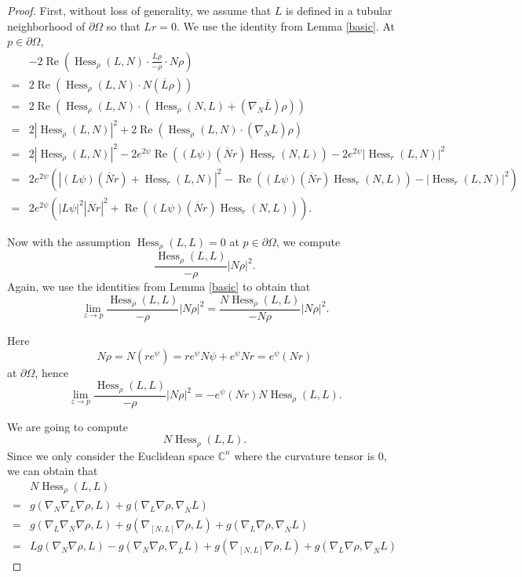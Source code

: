\documentclass[11pt]{article}
\theoremstyle{plain} \numberwithin{equation}{section}
\theoremstyle{definition}
\DeclareMathOperator{\Hessian}{Hess}
\renewcommand{\Re}{\operatorname{Re}}
\begin{document}
	\begin{proof}
		First, without loss of generality, we assume that $L$ is defined in a tubular neighborhood of $\partial\Omega$ so that $Lr=0$.
We use the identity from Lemma \ref{basic}. At $p\in \partial\Omega$,
			\[\begin{split}
		&-2\Re\left(\Hessian_{\rho} (L, N)\cdot\frac{\overline{L}\rho}{-\rho}\cdot N\rho\right)\\=
		&2\Re\left(\Hessian_\rho(L, N)\cdot N(\overline{L}\rho)\right)\\=&2\Re\left(\Hessian_\rho(L, N)\cdot (\Hessian_\rho(N, L)+(\nabla_N\overline{L})\rho)\right)\\=&2|\Hessian_\rho(L, N)|^2+2\Re\left(\Hessian_\rho(L, N)\cdot (\nabla_N\overline{L})\rho\right)\\=&2|\Hessian_\rho(L, N)|^2-2e^{2\psi}\Re\left((L\psi)(\overline{N}r)\Hessian_r(N, L)\right)-2e^{2\psi}|\Hessian_r(L, N)|^2\\=&2e^{2\psi}\left(|(L\psi)(\overline{N}r)+\Hessian_r(L, N)|^2-\Re\left((L\psi)(\overline{N}r)\Hessian_r(N, L)\right)-|\Hessian_r(L, N)|^2\right)\\=&2e^{2\psi}\left(|L\psi|^2|\overline{N}r|^2+\Re\left((L\psi)(\overline{N}r)\Hessian_r(N, L)\right)\right).
		\end{split}\]
		
		Now with the assumption $\Hessian_\rho(L, L)=0$ at $p\in\partial\Omega$, we compute \[
		\frac{\Hessian_{\rho} (L, L)}{-\rho}\left|N\rho\right|^2.\]Again, we use the identities from Lemma \ref{basic} to obtain that
		\[
		\lim\limits_{z\to p}\frac{\Hessian_{\rho} (L, L)}{-\rho}\left|N\rho\right|^2=\frac{N\Hessian_{\rho} (L, L)}{-N\rho}\left|N\rho\right|^2.\]
		
		Here \[N\rho=N(r e^\psi)=r e^\psi N\psi+e^\psi Nr=e^\psi(Nr)\] at $\partial\Omega$, hence \[\lim\limits_{z\to p}\frac{\Hessian_{\rho} (L, L)}{-\rho}\left|N\rho\right|^2=-e^\psi (Nr)N\Hessian_{\rho} (L, L).\]
		
		We are going to compute \[N\Hessian_\rho(L, L).\] Since we only consider the Euclidean space $\mathbb{C}^n$ where the curvature tensor is 0, we can obtain that	\[\begin{split}
		&N\Hessian_\rho(L, L)\\=&g(\nabla_N\nabla_L\nabla\rho, L)+g(\nabla_L\nabla\rho, \nabla_{\overline{N}} L)\\=&g(\nabla_L\nabla_N\nabla\rho, L)+g(\nabla_{[N, L]}\nabla\rho, L)+g(\nabla_L\nabla\rho, \nabla_{\overline{N}} L)\\=&Lg(\nabla_N\nabla\rho, L)-g(\nabla_N\nabla\rho, \nabla_{\overline{L}}L)+g(\nabla_{[N, L]}\nabla\rho, L)+g(\nabla_L\nabla\rho, \nabla_{\overline{N}} L)
		\end{split}\]
		

\end{proof}
\end{document}

